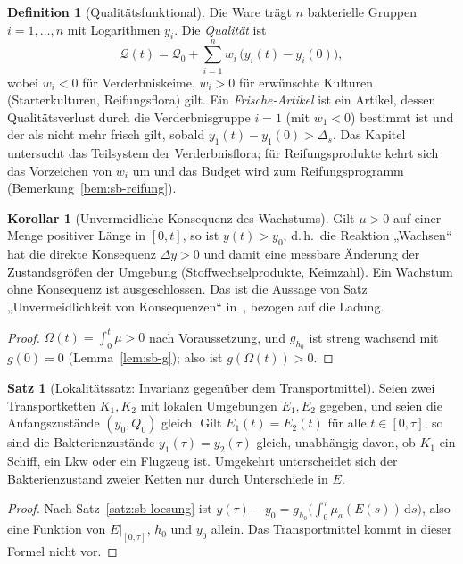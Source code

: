 \documentclass[a4paper, 12pt, twoside, openright]{report}
\theoremstyle{definition}
\newtheorem{definition}[theorem]{Definition}
\theoremstyle{definition}
\newtheorem{satz}{Satz}[chapter]
\newtheorem{korollar}{Korollar}[chapter]
\begin{document}
\begin{definition}[Qualitätsfunktional]\label{def:sb-qualitaet}
Die Ware trägt $n$ bakterielle Gruppen $i=1,\dots,n$ mit Logarithmen $y_i$. Die
\emph{Qualität} ist
\[
  \mathcal Q(t)=\mathcal Q_0+\sum_{i=1}^{n}w_i\,\bigl(y_i(t)-y_i(0)\bigr),
\]
wobei $w_i<0$ für Verderbniskeime, $w_i>0$ für erwünschte Kulturen (Starterkulturen,
Reifungsflora) gilt. Ein \emph{Frische-Artikel} ist ein Artikel, dessen Qualitätsverlust
durch die Verderbnisgruppe $i=1$ (mit $w_1<0$) bestimmt ist und der als nicht mehr frisch
gilt, sobald $y_1(t)-y_1(0)>\Delta_{s}$. Das Kapitel untersucht das Teilsystem der
Verderbnisflora; für Reifungsprodukte kehrt sich das Vorzeichen von $w_i$ um und das
Budget wird zum Reifungsprogramm (Bemerkung~\ref{bem:sb-reifung}).
\end{definition}

\begin{korollar}[Unvermeidliche Konsequenz des Wachstums]\label{kor:sb-konsequenz}
Gilt $\mu>0$ auf einer Menge positiver Länge in $[0,t]$, so ist $y(t)>y_0$, d.\,h.\ die
Reaktion „Wachsen“ hat die direkte Konsequenz $\Delta y>0$ und damit eine messbare
Änderung der Zustandsgrößen der Umgebung (Stoffwechselprodukte, Keimzahl). Ein Wachstum
ohne Konsequenz ist ausgeschlossen. Das ist die Aussage von Satz „Unvermeidlichkeit von
Konsequenzen“ in~\cite{epp_bakterien}, bezogen auf die Ladung.
\end{korollar}

\begin{proof}
$\Omega(t)=\int_0^t\mu>0$ nach Voraussetzung, und $g_{h_0}$ ist streng wachsend mit
$g(0)=0$ (Lemma~\ref{lem:sb-g}); also ist $g(\Omega(t))>0$.
\end{proof}

\begin{satz}[Lokalitätssatz: Invarianz gegenüber dem Transportmittel]\label{satz:sb-invarianz}
Seien zwei Transportketten $K_1,K_2$ mit lokalen Umgebungen $E_1,E_2$ gegeben, und seien
die Anfangszustände $(y_0,Q_0)$ gleich. Gilt $E_1(t)=E_2(t)$ für alle $t\in[0,\tau]$, so
sind die Bakterienzustände $y_1(\tau)=y_2(\tau)$ gleich, unabhängig davon, ob $K_1$ ein
Schiff, ein Lkw oder ein Flugzeug ist. Umgekehrt unterscheidet sich der Bakterienzustand
zweier Ketten nur durch Unterschiede in $E$.
\end{satz}

\begin{proof}
Nach Satz~\ref{satz:sb-loesung} ist $y(\tau)-y_0=g_{h_0}\bigl(\int_0^\tau\mu_a(E(s))\,\mathrm ds\bigr)$,
also eine Funktion von $E|_{[0,\tau]}$, $h_0$ und $y_0$ allein. Das Transportmittel
kommt in dieser Formel nicht vor.
\end{proof}
\end{document}
